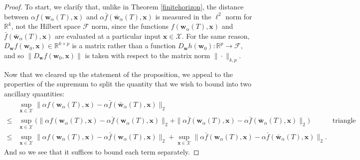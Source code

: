 \documentclass{article}
\begin{document}
\begin{proof}
To start, we clarify that, unlike in Theorem \ref{finitehorizon}, the distance between $\alpha f(\boldsymbol{w}_{\alpha}(T), \boldsymbol{x})$ and $\alpha \bar{f}(\boldsymbol{\bar{w}}_{\alpha}(T), \boldsymbol{x})$ is measured in the $\ell^2$ norm for $\mathbb{R}^k$, not the Hilbert space $\mathcal{F}$ norm, since the functions $f(\boldsymbol{w}_{\alpha}(T), \boldsymbol{x})$ and $\bar{f}(\boldsymbol{\bar{w}}_{\alpha}(T), \boldsymbol{x})$ are evaluated at a particular input $\boldsymbol{x} \in \mathcal{X}$. For the same reason, $D_{\boldsymbol{w}}f(\boldsymbol{w}_0, \boldsymbol{x}) \in \mathbb{R}^{k \times p}$ is a matrix rather than a function $D_{\boldsymbol{w}}h(\boldsymbol{w}_0): \mathbb{R}^p \rightarrow \mathcal{F}$, and so $\| D_{\boldsymbol{w}}f(\boldsymbol{w}_0, \boldsymbol{x}) \|$ is taken with respect to the matrix norm $\| \cdot \|_{k, p}$.

Now that we cleared up the statement of the proposition, we appeal to the properties of the supremum to split the quantity that we wish to bound into two ancillary quantities:
\begin{align*}
    &\sup_{\boldsymbol{x} \in \mathcal{X}} \| \alpha f(\boldsymbol{w}_{\alpha}(T), \boldsymbol{x}) - \alpha \bar{f}(\boldsymbol{\bar{w}}_{\alpha}(T), \boldsymbol{x}) \|_2\\
    \leq& \sup_{\boldsymbol{x} \in \mathcal{X}} \bigg( \| \alpha f(\boldsymbol{w}_{\alpha}(T), \boldsymbol{x}) - \alpha \bar{f}(\boldsymbol{w}_{\alpha}(T), \boldsymbol{x}) \|_2 + \| \alpha \bar{f}(\boldsymbol{w}_{\alpha}(T), \boldsymbol{x}) - \alpha \bar{f}(\boldsymbol{\bar{w}}_{\alpha}(T), \boldsymbol{x}) \|_2 \bigg) & \text{triangle inequality}\\
    \leq& \sup_{\boldsymbol{x} \in \mathcal{X}} \| \alpha f(\boldsymbol{w}_{\alpha}(T), \boldsymbol{x}) - \alpha \bar{f}(\boldsymbol{w}_{\alpha}(T), \boldsymbol{x}) \|_2 + \sup_{\boldsymbol{x} \in \mathcal{X}}\| \alpha \bar{f}(\boldsymbol{w}_{\alpha}(T), \boldsymbol{x}) - \alpha \bar{f}(\boldsymbol{\bar{w}}_{\alpha}(T), \boldsymbol{x}) \|_2.
\end{align*}
And so we see that it suffices to bound each term separately.


\end{proof}
\end{document}
